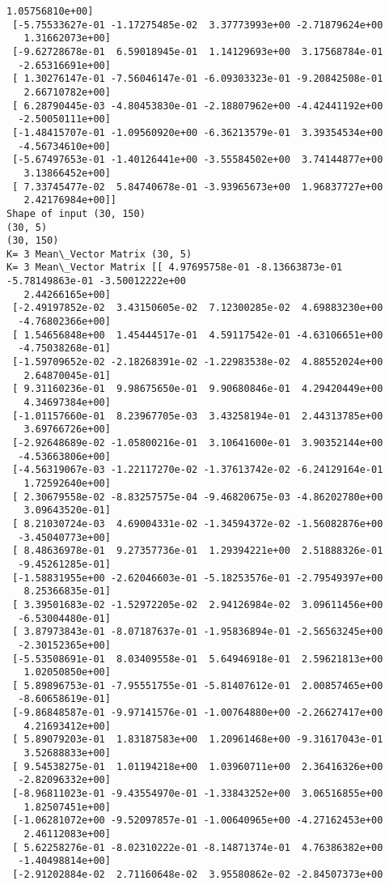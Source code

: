 \documentclass[11pt]{article}
\begin{document}
\begin{Verbatim}[commandchars=\\\{\}]
   1.05756810e+00]
 [-5.75533627e-01 -1.17275485e-02  3.37773993e+00 -2.71879624e+00
   1.31662073e+00]
 [-9.62728678e-01  6.59018945e-01  1.14129693e+00  3.17568784e-01
  -2.65316691e+00]
 [ 1.30276147e-01 -7.56046147e-01 -6.09303323e-01 -9.20842508e-01
   2.66710782e+00]
 [ 6.28790445e-03 -4.80453830e-01 -2.18807962e+00 -4.42441192e+00
  -2.50050111e+00]
 [-1.48415707e-01 -1.09560920e+00 -6.36213579e-01  3.39354534e+00
  -4.56734610e+00]
 [-5.67497653e-01 -1.40126441e+00 -3.55584502e+00  3.74144877e+00
   3.13866452e+00]
 [ 7.33745477e-02  5.84740678e-01 -3.93965673e+00  1.96837727e+00
   2.42176984e+00]]
Shape of input (30, 150)
(30, 5)
(30, 150)
K= 3 Mean\_Vector Matrix (30, 5)
K= 3 Mean\_Vector Matrix [[ 4.97695758e-01 -8.13663873e-01 -5.78149863e-01 -3.50012222e+00
   2.44266165e+00]
 [-2.49197852e-02  3.43150605e-02  7.12300285e-02  4.69883230e+00
  -4.76802366e+00]
 [ 1.54656848e+00  1.45444517e-01  4.59117542e-01 -4.63106651e+00
  -4.75038268e-01]
 [-1.59709652e-02 -2.18268391e-02 -1.22983538e-02  4.88552024e+00
   2.64870045e-01]
 [ 9.31160236e-01  9.98675650e-01  9.90680846e-01  4.29420449e+00
   4.34697384e+00]
 [-1.01157660e-01  8.23967705e-03  3.43258194e-01  2.44313785e+00
   3.69766726e+00]
 [-2.92648689e-02 -1.05800216e-01  3.10641600e-01  3.90352144e+00
  -4.53663806e+00]
 [-4.56319067e-03 -1.22117270e-02 -1.37613742e-02 -6.24129164e-01
   1.72592640e+00]
 [ 2.30679558e-02 -8.83257575e-04 -9.46820675e-03 -4.86202780e+00
   3.09643520e-01]
 [ 8.21030724e-03  4.69004331e-02 -1.34594372e-02 -1.56082876e+00
  -3.45040773e+00]
 [ 8.48636978e-01  9.27357736e-01  1.29394221e+00  2.51888326e-01
  -9.45261285e-01]
 [-1.58831955e+00 -2.62046603e-01 -5.18253576e-01 -2.79549397e+00
   8.25366835e-01]
 [ 3.39501683e-02 -1.52972205e-02  2.94126984e-02  3.09611456e+00
  -6.53004480e-01]
 [ 3.87973843e-01 -8.07187637e-01 -1.95836894e-01 -2.56563245e+00
  -2.30152365e+00]
 [-5.53508691e-01  8.03409558e-01  5.64946918e-01  2.59621813e+00
   1.02050850e+00]
 [ 5.89896753e-01 -7.95551755e-01 -5.81407612e-01  2.00857465e+00
  -8.60658619e-01]
 [-9.86848587e-01 -9.97141576e-01 -1.00764880e+00 -2.26627417e+00
   4.21693412e+00]
 [ 5.89079203e-01  1.83187583e+00  1.20961468e+00 -9.31617043e-01
   3.52688833e+00]
 [ 9.54538275e-01  1.01194218e+00  1.03960711e+00  2.36416326e+00
  -2.82096332e+00]
 [-8.96811023e-01 -9.43554970e-01 -1.33843252e+00  3.06516855e+00
   1.82507451e+00]
 [-1.06281072e+00 -9.52097857e-01 -1.00640965e+00 -4.27162453e+00
   2.46112083e+00]
 [ 5.62258276e-01 -8.02310222e-01 -8.14871374e-01  4.76386382e+00
  -1.40498814e+00]
 [-2.91202884e-02  2.71160648e-02  3.95580862e-02 -2.84507373e+00

\end{Verbatim}
\end{document}

